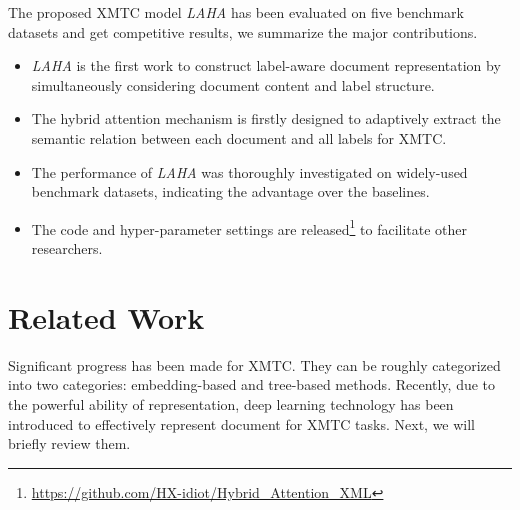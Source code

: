 \documentclass[runningheads]{llncs}
\begin{document}
 The proposed XMTC model \textit{LAHA} has been evaluated on five benchmark datasets and get competitive results, we summarize the major contributions.
\begin{itemize}
	\item \textit{LAHA} is the first work to construct label-aware document representation by simultaneously considering document content and label structure. 
	\item The hybrid attention mechanism is firstly designed to adaptively extract the semantic relation between each document and all labels for XMTC.
	\item The performance of \textit{LAHA} was thoroughly investigated on widely-used benchmark datasets, indicating the advantage over the baselines.
	\item The code and hyper-parameter settings are released\footnote{\url{https://github.com/HX-idiot/Hybrid_Attention_XML}} to facilitate other researchers.
\end{itemize}
\vspace{-2mm}
\section{Related Work}
Significant progress has been made for XMTC. They can be roughly categorized into two categories: embedding-based and tree-based methods. Recently, due to the powerful ability of representation, deep learning technology has been introduced to effectively represent document for XMTC tasks. Next, we will briefly review them.
\vspace{-2mm}
\end{document}
